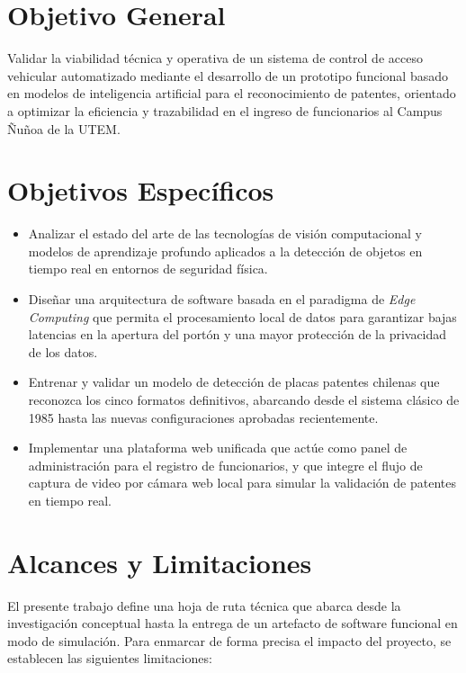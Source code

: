 \section*{Objetivo General}
Validar la viabilidad técnica y operativa de un sistema de control de acceso vehicular automatizado mediante el desarrollo de un prototipo funcional basado en modelos de inteligencia artificial para el reconocimiento de patentes, orientado a optimizar la eficiencia y trazabilidad en el ingreso de funcionarios al Campus Ñuñoa de la UTEM.

\section*{Objetivos Específicos}
\begin{itemize}
    \item Analizar el estado del arte de las tecnologías de visión computacional y modelos de aprendizaje profundo aplicados a la detección de objetos en tiempo real en entornos de seguridad física.
    \item Diseñar una arquitectura de software basada en el paradigma de \textit{Edge Computing} que permita el procesamiento local de datos para garantizar bajas latencias en la apertura del portón y una mayor protección de la privacidad de los datos.
    \item Entrenar y validar un modelo de detección de placas patentes chilenas que reconozca los cinco formatos definitivos, abarcando desde el sistema clásico de 1985 hasta las nuevas configuraciones aprobadas recientemente.
    \item Implementar una plataforma web unificada que actúe como panel de administración para el registro de funcionarios, y que integre el flujo de captura de video por cámara web local para simular la validación de patentes en tiempo real.
\end{itemize}

\section*{Alcances y Limitaciones}
\label{sec:alcances_limitaciones}
El presente trabajo define una hoja de ruta técnica que abarca desde la investigación conceptual hasta la entrega de un artefacto de software funcional en modo de simulación. Para enmarcar de forma precisa el impacto del proyecto, se establecen las siguientes limitaciones:

